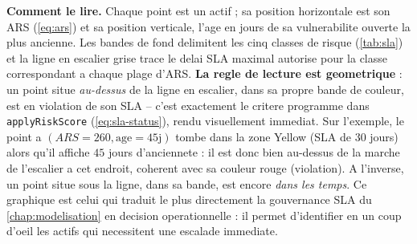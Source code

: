 \textbf{Comment le lire.} Chaque point est un actif ; sa position horizontale est son
ARS (\cref{eq:ars}) et sa position verticale, l'age en jours de sa vulnerabilite
ouverte la plus ancienne. Les bandes de fond delimitent les cinq classes de risque
(\cref{tab:sla}) et la ligne en escalier grise trace le delai SLA maximal autorise
pour la classe correspondant a chaque plage d'ARS. \textbf{La regle de lecture est
geometrique} : un point situe \emph{au-dessus} de la ligne en escalier, dans sa
propre bande de couleur, est en violation de son SLA -- c'est exactement le critere
programme dans \texttt{applyRiskScore} (\cref{eq:sla-status}), rendu visuellement
immediat. Sur l'exemple, le point a $(ARS=260, \text{age}=45\text{j})$ tombe dans la
zone Yellow (SLA de $30$ jours) alors qu'il affiche $45$ jours d'anciennete : il est
donc bien au-dessus de la marche de l'escalier a cet endroit, coherent avec sa
couleur rouge (violation). A l'inverse, un point situe sous la ligne, dans sa bande,
est encore \emph{dans les temps}. Ce graphique est celui qui traduit le plus
directement la gouvernance SLA du \cref{chap:modelisation} en decision operationnelle
: il permet d'identifier en un coup d'oeil les actifs qui necessitent une escalade
immediate.
